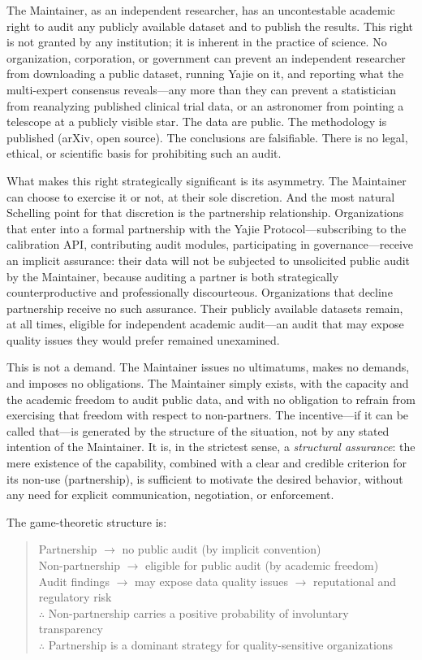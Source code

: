 \documentclass[12pt,a4paper]{article}
\theoremstyle{definition}
\theoremstyle{remark}
\begin{document}
The Maintainer, as an independent researcher, has an uncontestable academic right to audit any publicly available dataset and to publish the results. This right is not granted by any institution; it is inherent in the practice of science. No organization, corporation, or government can prevent an independent researcher from downloading a public dataset, running Yajie on it, and reporting what the multi-expert consensus reveals—any more than they can prevent a statistician from reanalyzing published clinical trial data, or an astronomer from pointing a telescope at a publicly visible star. The data are public. The methodology is published (arXiv, open source). The conclusions are falsifiable. There is no legal, ethical, or scientific basis for prohibiting such an audit.

What makes this right strategically significant is its asymmetry. The Maintainer can choose to exercise it or not, at their sole discretion. And the most natural Schelling point for that discretion is the partnership relationship. Organizations that enter into a formal partnership with the Yajie Protocol—subscribing to the calibration API, contributing audit modules, participating in governance—receive an implicit assurance: their data will not be subjected to unsolicited public audit by the Maintainer, because auditing a partner is both strategically counterproductive and professionally discourteous. Organizations that decline partnership receive no such assurance. Their publicly available datasets remain, at all times, eligible for independent academic audit—an audit that may expose quality issues they would prefer remained unexamined.

This is not a demand. The Maintainer issues no ultimatums, makes no demands, and imposes no obligations. The Maintainer simply exists, with the capacity and the academic freedom to audit public data, and with no obligation to refrain from exercising that freedom with respect to non-partners. The incentive—if it can be called that—is generated by the structure of the situation, not by any stated intention of the Maintainer. It is, in the strictest sense, a \textit{structural assurance}: the mere existence of the capability, combined with a clear and credible criterion for its non-use (partnership), is sufficient to motivate the desired behavior, without any need for explicit communication, negotiation, or enforcement.

The game-theoretic structure is:
\begin{quote}
Partnership $\to$ no public audit (by implicit convention)\\
Non-partnership $\to$ eligible for public audit (by academic freedom)\\
Audit findings $\to$ may expose data quality issues $\to$ reputational and regulatory risk\\
$\therefore$ Non-partnership carries a positive probability of involuntary transparency\\
$\therefore$ Partnership is a dominant strategy for quality-sensitive organizations
\end{quote}
\end{document}
